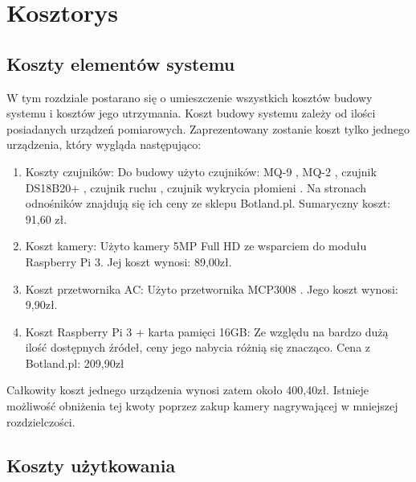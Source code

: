 \chapter{Kosztorys}

\section{Koszty elementów systemu}
W tym rozdziale postarano się o umieszczenie wszystkich kosztów budowy systemu i kosztów jego utrzymania. Koszt budowy systemu zależy od ilości posiadanych urządzeń pomiarowych. Zaprezentowany zostanie koszt tylko jednego urządzenia, który wygląda następująco:
\begin{enumerate}
\item Koszty czujników:
Do budowy użyto czujników: MQ-9 \cite{specyfikacjaMQ-9}, MQ-2 \cite{specyfikacjaMQ-2}, czujnik DS18B20+ \cite{specyfikacjaTemp}, czujnik ruchu \cite{pir}, czujnik wykrycia płomieni \cite {specyfikacjaFlame}. Na stronach odnośników znajdują się ich ceny ze sklepu Botland.pl. Sumaryczny koszt: 91,60 zł.
\item Koszt kamery:
Użyto kamery 5MP Full HD ze wsparciem do modułu Raspberry Pi 3. Jej koszt wynosi: 89,00zł.
\item Koszt przetwornika AC:
Użyto przetwornika MCP3008 \cite{specyfikacjaAC}. Jego koszt wynosi: 9,90zł.
\item Koszt Raspberry Pi 3 + karta pamięci 16GB: 
Ze względu na bardzo dużą ilość dostępnych źródeł, ceny jego nabycia różnią się znacząco. Cena z Botland.pl: 209,90zł
\end{enumerate}
Całkowity koszt jednego urządzenia wynosi zatem około 400,40zł. Istnieje możliwość obniżenia tej kwoty poprzez zakup kamery nagrywającej w mniejszej rozdzielczości. 

\section{Koszty użytkowania}

